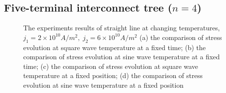 \subsection{Five-terminal interconnect tree ($n=4$)}
\begin{figure}[!h]
\centering
{}
\caption{The experiments results of straight line at changing temperatures, $j_1=2\times10^{10}A/m^2,\;j_2=6\times10^{10}A/m^2$ (a) the comparison of stress evolution at square wave temperature at a fixed time; (b) the comparison of stress evolution at sine wave temperature at a fixed time; (c) the comparison of stress evolution at square wave temperature at a fixed position; (d) the comparison of stress evolution at sine wave temperature at a fixed position}
\label{fig:S4Results1}
\end{figure}


